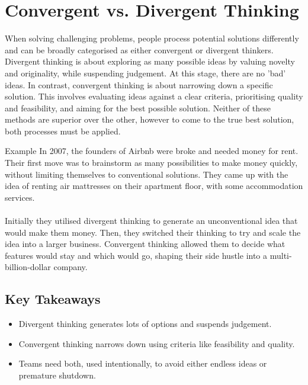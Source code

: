 \documentclass{report}
\begin{document}
	\section{Convergent vs. Divergent Thinking}

		When solving challenging problems, people process potential solutions differently and can be broadly categorised as either convergent or divergent thinkers. Divergent thinking is about exploring as many possible ideas by valuing novelty and originality, while suspending judgement. At this stage, there are no 'bad' ideas. In contrast, convergent thinking is about narrowing down a specific solution. This involves evaluating ideas against a clear criteria, prioritising quality and feasibility, and aiming for the best possible solution. Neither of these methods are superior over the other, however to come to the true best solution, both processes must be applied.

		\begin{question}{Example}
			In 2007, the founders of Airbnb were broke and needed money for rent. Their first move was to brainstorm as many possibilities to make money quickly, without limiting themselves to conventional solutions. They came up with the idea of renting air mattresses on their apartment floor, with some accommodation services.
			\\ \\
			Initially they utilised divergent thinking to generate an unconventional idea that would make them money. Then, they switched their thinking to try and scale the idea into a larger business. Convergent thinking allowed them to decide what features would stay and which would go, shaping their side hustle into a multi-billion-dollar company.
		\end{question}

		\subsection{Key Takeaways}

			\begin{itemize}
				\item Divergent thinking generates lots of options and suspends judgement.
				\item Convergent thinking narrows down using criteria like feasibility and quality.
				\item Teams need both, used intentionally, to avoid either endless ideas or premature shutdown.
			\end{itemize}
\end{document}
